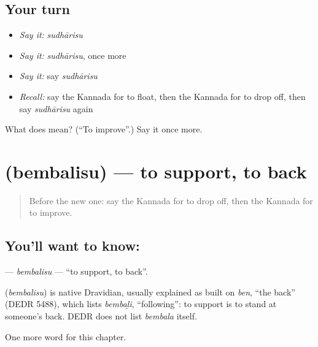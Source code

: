 \subsection*{Your turn}
\begin{itemize}
\raggedright
  \item \emph{Say it:} \emph{sudhārisu}
  \item \emph{Say it:} \emph{sudhārisu}, once more
  \item \emph{Say it:} say \emph{sudhārisu}
  \item \emph{Recall:} say the Kannada for to float, then the Kannada for to drop off, then say \emph{sudhārisu} again
\end{itemize}

\begin{tcolorbox}[breakable,colback=teal!4,colframe=teal!35!black,title={Before you move on}]
What does  mean? (\textquotedblleft{}To improve\textquotedblright{}.) Say it once more.
\end{tcolorbox}
\section[\texorpdfstring{\kn{ಬೆಂಬಲಿಸು} (bembalisu)}{ಬೆಂಬಲಿಸು (bembalisu)}]{ (bembalisu) — to support, to back}

\label{lesson:KA-C167-bembalisu}



\begin{quote}
Before the new one: say the Kannada for to drop off, then the Kannada for to improve.
\end{quote}

\subsection*{You'll want to know: }
\textbf{} — \emph{bembalisu} — \textquotedblleft{}to support, to back\textquotedblright{}.

\begin{cousinweb}
\textbf{} (\emph{bembalisu}) is native Dravidian, usually explained as built on \emph{ben}, \textquotedblleft{}the back\textquotedblright{} (DEDR 5488), which lists \emph{bembaḻi}, \textquotedblleft{}following\textquotedblright{}: to support is to stand at someone's back. DEDR does not list \emph{bembala} itself.
\end{cousinweb}

\begin{grammarlens}[title={What you've built}]
One more word for this chapter.
\end{grammarlens}

